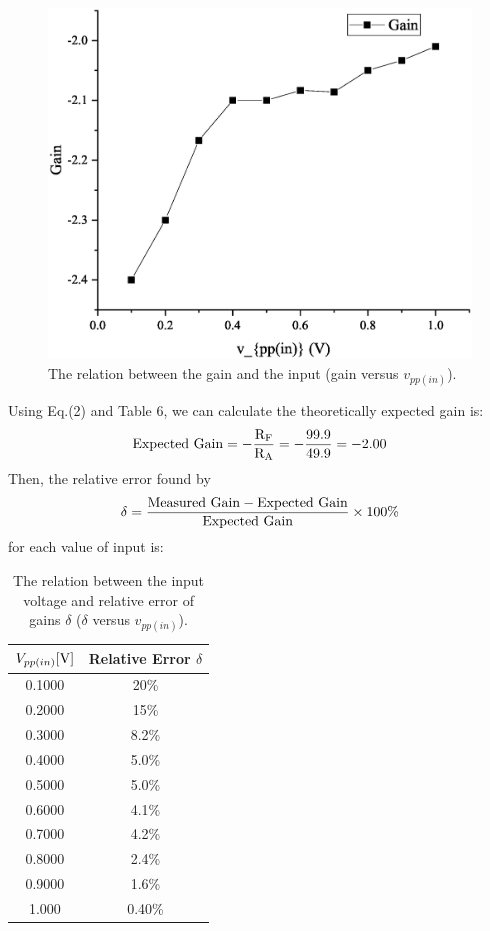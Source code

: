 \documentclass[a4paper]{report}
\begin{document}
	\begin{figure}[H]
		\centering
		\includegraphics[width=1\linewidth]{11.eps}
		\caption{The relation between the gain and the input (gain versus $v_{pp(in)}$).}
	\end{figure}
	Using Eq.(2) and Table 6, we can calculate the theoretically expected gain is:
	\begin{equation*}
	\rm{Expected\ Gain}=-\dfrac{R_F}{R_A}=-\dfrac{99.9}{49.9}=-2.00
	\end{equation*}
	Then, the relative error found by
	\begin{equation*}
	\delta=\rm{\dfrac{Measured\ Gain-Expected\ Gain}{Expected\ Gain}}\times100\%
	\end{equation*}	
	for each value of input is:
	\begin{table}[H]
		\centering
		\begin{tabular}{|c|c|}
			\hline
			$V_{pp(in)}[\rm{V}]$&Relative Error $\delta$\\
			\hline
			0.1000&20\%\\
			\hline
			0.2000&15\%\\
			\hline
			0.3000&8.2\%\\
			\hline
			0.4000&5.0\%\\
			\hline
			0.5000&5.0\%\\
			\hline
			0.6000&4.1\%\\
			\hline
			0.7000&4.2\%\\
			\hline
			0.8000&2.4\%\\
			\hline
			0.9000&1.6\%\\
			\hline
			1.000&0.40\%\\
			\hline
		\end{tabular}
		\caption{The relation between the input voltage and relative error of gains $\delta$ ($\delta$ versus $v_{pp(in)}$).}
	\end{table}
\end{document}
